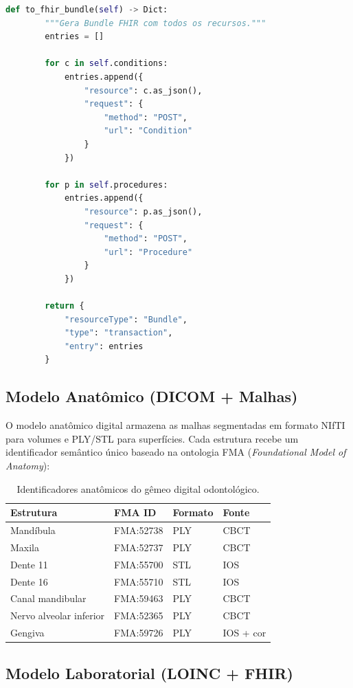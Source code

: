\begin{lstlisting}[language=Python, caption=Construcao do modelo clinico FHIR para o gemeo digital, label=code:fhir-clinico]
    def to_fhir_bundle(self) -> Dict:
        """Gera Bundle FHIR com todos os recursos."""
        entries = []

        for c in self.conditions:
            entries.append({
                "resource": c.as_json(),
                "request": {
                    "method": "POST",
                    "url": "Condition"
                }
            })

        for p in self.procedures:
            entries.append({
                "resource": p.as_json(),
                "request": {
                    "method": "POST",
                    "url": "Procedure"
                }
            })

        return {
            "resourceType": "Bundle",
            "type": "transaction",
            "entry": entries
        }
\end{lstlisting}

\subsection{Modelo Anatômico (DICOM + Malhas)}
\label{subsec:modelo-anatomico}

O modelo anatômico digital armazena as malhas segmentadas em formato NIfTI para volumes e PLY/STL para superfícies. Cada estrutura recebe um identificador semântico único baseado na ontologia FMA (\textit{Foundational Model of Anatomy}):

\begin{longtable}{p{3cm}p{3cm}p{2cm}p{3cm}}
\caption{Identificadores anatômicos do gêmeo digital odontológico.}
\label{tab:ids-anatomicos}\\
\toprule
\textbf{Estrutura} & \textbf{FMA ID} & \textbf{Formato} & \textbf{Fonte} \\
\midrule
Mandíbula & FMA:52738 & PLY & CBCT \\
Maxila & FMA:52737 & PLY & CBCT \\
Dente 11 & FMA:55700 & STL & IOS \\
Dente 16 & FMA:55710 & STL & IOS \\
Canal mandibular & FMA:59463 & PLY & CBCT \\
Nervo alveolar inferior & FMA:52365 & PLY & CBCT \\
Gengiva & FMA:59726 & PLY & IOS + cor \\
\bottomrule
\end{longtable}

\subsection{Modelo Laboratorial (LOINC + FHIR)}
\label{subsec:modelo-laboratorial}

